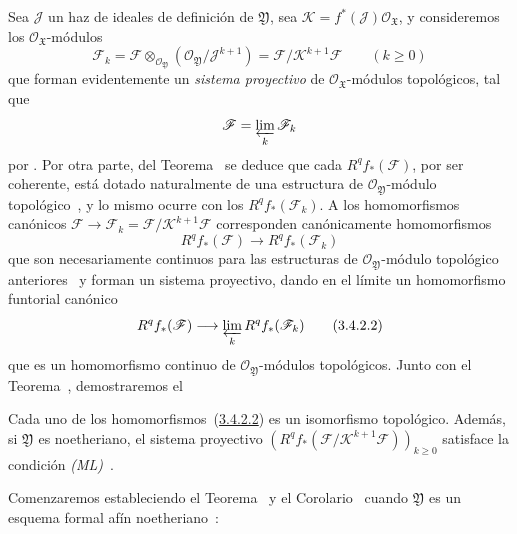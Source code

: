 Sea $\mathcal J$ un haz de ideales de definición de $\mathfrak Y$, sea $\mathcal K=f^*(\mathcal J)\mathcal O_{\mathfrak X}$, y consideremos los $\mathcal O_{\mathfrak X}$-módulos
\[
\mathcal F_k=\mathcal F\otimes_{\mathcal O_{\mathfrak Y}}
(\mathcal O_{\mathfrak Y}/\mathcal J^{k+1})
=\mathcal F/\mathcal K^{k+1}\mathcal F\qquad(k\geq0)
\tag{3.4.2.1}\label{III.3.4.2.1-fr}
\]
que forman evidentemente un \emph{sistema proyectivo} de $\mathcal O_{\mathfrak X}$-módulos topológicos, tal que
\[
\mathcal F=\varprojlim_k\mathcal F_k
\]
por .
Por otra parte, del Teorema~ se deduce que cada $R^qf_*(\mathcal F)$, por ser coherente, está dotado naturalmente de una estructura de $\mathcal O_{\mathfrak Y}$-módulo topológico~, y lo mismo ocurre con los $R^qf_*(\mathcal F_k)$.
A los homomorfismos canónicos $\mathcal F\to\mathcal F_k=\mathcal F/\mathcal K^{k+1}\mathcal F$ corresponden canónicamente homomorfismos
\[
R^qf_*(\mathcal F)\longrightarrow R^qf_*(\mathcal F_k)
\]
que son necesariamente continuos para las estructuras de $\mathcal O_{\mathfrak Y}$-módulo topológico anteriores~ y forman un sistema proyectivo, dando en el límite un homomorfismo funtorial canónico
\[
R^qf_*(\mathcal F)\longrightarrow\varprojlim_kR^qf_*(\mathcal F_k)
\tag{3.4.2.2}\label{III.3.4.2.2-fr}
\]
que es un homomorfismo continuo de $\mathcal O_{\mathfrak Y}$-módulos topológicos.
Junto con el Teorema~, demostraremos el
\begin{corollary}[3.4.3]
\label{III.3.4.3}
\label{III.3.4.3-fr}
Cada uno de los homomorfismos~(\hyperref[III.3.4.2.2]{3.4.2.2}) es un isomorfismo topológico.
Además, si $\mathfrak Y$ es noetheriano, el sistema proyectivo $(R^qf_*(\mathcal F/\mathcal K^{k+1}\mathcal F))_{k\geq0}$ satisface la condición \emph{(ML)}~.
\end{corollary}
Comenzaremos estableciendo el Teorema~ y el Corolario~ cuando $\mathfrak Y$ es un esquema formal afín noetheriano~:
